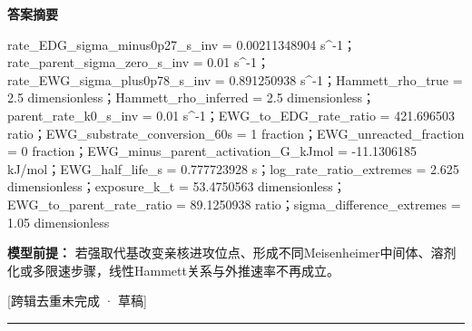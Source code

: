 \documentclass[UTF8,11pt,a4paper]{ctexart}
\begin{document}
\noindent\textbf{答案摘要}\par
rate\_EDG\_sigma\_minus0p27\_s\_inv = 0.00211348904 s\textasciicircum{}-1；rate\_parent\_sigma\_zero\_s\_inv = 0.01 s\textasciicircum{}-1；rate\_EWG\_sigma\_plus0p78\_s\_inv = 0.891250938 s\textasciicircum{}-1；Hammett\_rho\_true = 2.5 dimensionless；Hammett\_rho\_inferred = 2.5 dimensionless；parent\_rate\_k0\_s\_inv = 0.01 s\textasciicircum{}-1；EWG\_to\_EDG\_rate\_ratio = 421.696503 ratio；EWG\_substrate\_conversion\_60s = 1 fraction；EWG\_unreacted\_fraction = 0 fraction；EWG\_minus\_parent\_activation\_G\_kJmol = -11.1306185 kJ/mol；EWG\_half\_life\_s = 0.777723928 s；log\_rate\_ratio\_extremes = 2.625 dimensionless；exposure\_k\_t = 53.4750563 dimensionless；EWG\_to\_parent\_rate\_ratio = 89.1250938 ratio；sigma\_difference\_extremes = 1.05 dimensionless\par
\noindent\textbf{模型前提：}
若强取代基改变亲核进攻位点、形成不同Meisenheimer中间体、溶剂化或多限速步骤，线性Hammett关系与外推速率不再成立。\par
\noindent\textcolor{red!65!black}{[跨辑去重未完成 · 草稿]} \par
\medskip\hrule\medskip
{}
\end{document}
